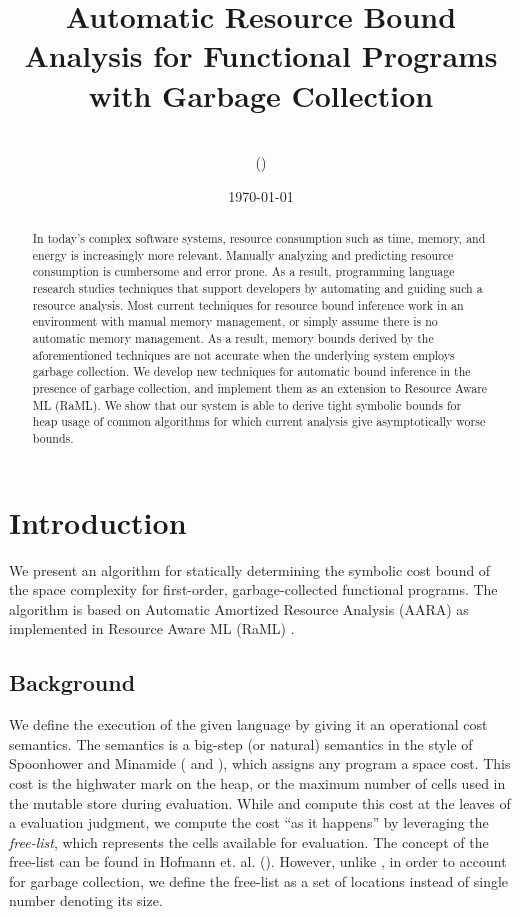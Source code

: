 \documentclass[11pt]{article}
\title{Automatic Resource Bound Analysis for Functional Programs with Garbage Collection}
\author{\myname\\(\myandrewid)}
\date{\today}
\theoremstyle{definition}
\begin{document}
\maketitle
{}

\begin{abstract}
In today’s complex software systems, resource consumption such as time, memory, and energy is
increasingly more relevant. Manually analyzing and predicting resource consumption is cumbersome
and error prone. As a result, programming language research studies techniques that support developers
by automating and guiding such a resource analysis. Most current techniques for resource bound
inference work in an environment with manual memory management, or simply assume there is no
automatic memory management. As a result, memory bounds derived by the aforementioned techniques
are not accurate when the underlying system employs garbage collection. We
develop new techniques for automatic bound inference in the presence of garbage collection, and 
implement them as an extension to Resource Aware ML (RaML). We show that our system is able to 
derive tight symbolic bounds for heap usage of common algorithms for which current analysis give 
asymptotically worse bounds.
\end{abstract}

\section{Introduction}

\noindent
We present an algorithm for statically determining the symbolic cost bound 
of the space complexity for first-order, garbage-collected functional programs. 
The algorithm is based on Automatic Amortized Resource Analysis (AARA) as implemented 
in Resource Aware ML (RaML) \cite{Hoffmann:2017:TAR:3009837.3009842}.

\subsection{Background}
\label{sect:background}

We define the execution of the given language by giving it an
operational cost semantics. The semantics is a big-step
(or natural) semantics in the style of Spoonhower and Minamide (\cite{Spoonhower:2008:SPP:1411204.1411240} and 
\cite{DBLP:journals/entcs/Minamide99}), which assigns any program a space cost. This cost is
the highwater mark on the heap, or the maximum number of cells used in the mutable store during 
evaluation. While \cite{Spoonhower:2008:SPP:1411204.1411240} and 
\cite{DBLP:journals/entcs/Minamide99} compute this cost at the leaves of a 
evaluation judgment, we compute the cost ``as it happens'' by leveraging the \emph{free-list},
which represents the cells available for evaluation. 
The concept of the free-list can be found in Hofmann et. al. (\cite{Hofmann:2003:SPH:604131.604148}).
However, unlike \cite{Hofmann:2003:SPH:604131.604148}, in order to account for garbage collection,
we define the free-list as a set of locations instead of single number denoting its size.\\
\end{document}
